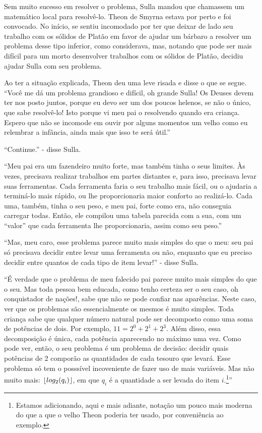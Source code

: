 \documentclass{article}
\begin{document}
Sem muito sucesso em resolver o problema, Sulla mandou que chamassem um matemático local para
resolvê-lo. Theon de Smyrna estava por perto e foi convocado. No início, se sentiu
incomodado por ter que deixar de lado seu trabalho com os sólidos de Platão em favor de
ajudar um bárbaro a resolver um problema desse tipo inferior, como considerava, mas,
notando que pode ser mais difícil para um morto desenvolver trabalhos com
os sólidos de Platão, decidiu ajudar Sulla com seu problema.

Ao ter a situação explicada, Theon deu uma leve risada e disse o que se segue. ``Você me dá um
problema grandioso e difícil, oh grande Sulla! Os Deuses devem ter nos posto juntos, porque eu devo
ser um dos poucos helenos, se não o único, que sabe resolvê-lo! Isto porque vi meu pai o resolvendo
quando era criança. Espero que não se incomode em ouvir por alguns momentos um velho como eu
relembrar a infância, ainda mais que isso te será útil.''

``Continue.'' - disse Sulla.

``Meu pai era um fazendeiro muito forte, mas também tinha o seus limites. Às vezes, precisava
realizar trabalhos em partes distantes e, para isso, precisava levar suas ferramentas. Cada
ferramenta faria o seu trabalho mais fácil, ou o ajudaria a terminá-lo mais rápido, ou lhe
proporcionaria maior conforto ao realizá-lo. Cada uma, também, tinha o seu peso, e meu pai, forte
como era, não conseguia carregar todas. Então, ele compilou uma tabela parecida com a sua, com um
``valor'' que cada ferramenta lhe proporcionaria, assim como seu peso.''

``Mas, meu caro, esse problema parece muito mais simples do que o meu: seu pai só precisava decidir
entre levar uma ferramenta ou não, enquanto que eu preciso decidir entre quantos de cada tipo de
item levar!'' - disse Sulla.

``É verdade que o problema de meu falecido pai parece muito mais simples do que o seu. Mas toda
pessoa bem educada, como tenho certeza ser o seu caso, oh conquistador de nações!, sabe que não se pode confiar nas aparências.
Neste caso, ver que os problemas são essencialmente os mesmos é muito simples. Toda criança sabe que
qualquer número natural pode ser decomposto como uma soma de potências de dois. Por exemplo, $11 = 2^0
+ 2^1 + 2^3$. Além disso, essa decomposição é única, cada potência aparecendo no máximo uma vez.
Como pode ver, então, o seu problema é um problema de decisão: decidir quais potências de 2 comporão
as quantidades de cada tesouro que levará. Esse problema só tem o posssível incoveniente de fazer
uso de mais variáveis. Mas não muito mais: $\lfloor log_2(q_i)\rfloor$, em que $q_i$ é a quantidade a ser
levada do item $i$.\footnote{Estamos adicionando, aqui e mais adiante, notação um pouco mais moderna
  do que a que o velho Theon poderia ter usado, por conveniência ao exemplo.}''
\end{document}
